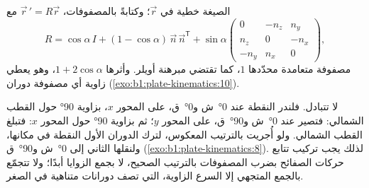 الصيغة خطية في $\vec r$؛ وكتابةً بالمصفوفات، $\vec r\,' = R\vec r$ مع
\[
  R = \cos\alpha\,I + (1 - \cos\alpha)\,\vec n\,\vec n^{\mathsf T}
  + \sin\alpha
  \begin{pmatrix} 0 & -n_z & n_y\\ n_z & 0 & -n_x\\ -n_y & n_x & 0\end{pmatrix},
\]
مصفوفة متعامدة محدّدها $1$، كما تقتضي مبرهنة أويلر. وأثرها $1 + 2\cos\alpha$، وهو يعطي زاوية أي مصفوفة دوران (\cref{exo:b1:plate-kinematics:10}).

 لا تتبادل. فلندر النقطة عند \ang{0}~ش و\ang{0}~ق، على المحور $x$، بزاوية \ang{90} حول القطب الشمالي: فتصير عند \ang{0}~ش و\ang{90}~ق، على المحور $y$؛ ثم بزاوية \ang{90} حول المحور $x$: فتبلغ القطب الشمالي. ولو أُجريت بالترتيب المعكوس، لترك الدوران الأول النقطة في مكانها، ولنقلها الثاني إلى \ang{0}~ش و\ang{90}~ق (\cref{exo:b1:plate-kinematics:8}). لذلك يجب تركيب تتابع حركات الصفائح بضرب المصفوفات بالترتيب الصحيح، لا بجمع الزوايا أبدًا؛ ولا تتجمّع بالجمع المتجهي إلا السرع الزاوية، التي تصف دورانات متناهية في الصغر.

